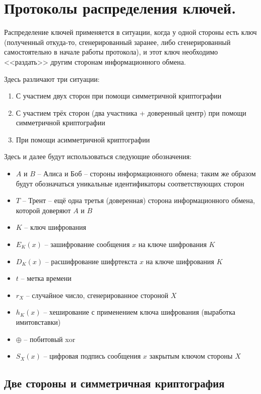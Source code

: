 \section{Протоколы распределения ключей.}

Распределение ключей применяется в ситуации, когда у одной стороны есть ключ (полученный откуда-то, сгенерированный заранее, либо сгенерированный самостоятельно в начале работы протокола), и этот ключ необходимо <<раздать>> другим сторонам информационного обмена. 

Здесь различают три ситуации:

\begin{enumerate}
	\item С участием двух сторон при помощи симметричной криптографии
	\item С участием трёх сторон (два участника + доверенный центр) при помощи симметричной криптографии
	\item При помощи асимметричной криптографии
\end{enumerate}

Здесь и далее будут использоваться следующие обозначения:

\begin{itemize}
	\item $A$ и $B$ -- Алиса и Боб -- стороны информационного обмена; таким же образом будут обозначаться уникальные идентификаторы соответствующих сторон
	\item $T$ -- Трент -- ещё одна третья (доверенная) сторона информационного обмена, которой доверяют $A$ и $B$
	\item $K$ -- ключ шифрования
	\item $E_K(x)$ -- зашифрование сообщения $x$ на ключе шифрования $K$
	\item $D_K(x)$ -- расшифрование шифртекста $x$ на ключе шифрования $K$
	\item $t$ -- метка времени
	\item $r_X$ -- случайное число, сгенерированное стороной $X$
	\item $h_K(x)$ -- хеширование с применением ключа шифрования (выработка имитовставки)
	\item $\oplus$ -- побитовый xor
	\item $S_X(x)$ -- цифровая подпись сообщения $x$ закрытым ключом стороны $X$
\end{itemize}

\subsection{Две стороны и симметричная криптография}

